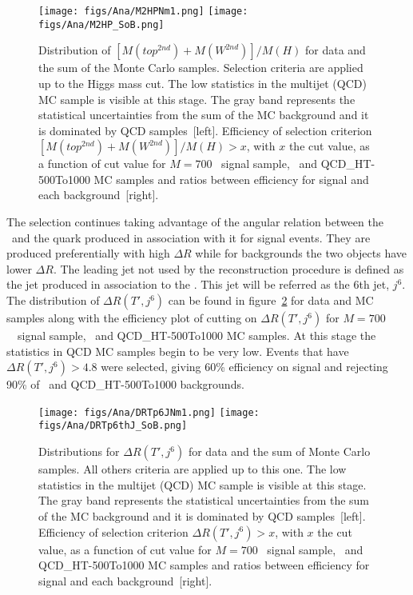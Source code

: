 \begin{figure}[!Hhtbp]
  \begin{center}
    \texttt{[image: figs/Ana/M2HPNm1.png]}
    \texttt{[image: figs/Ana/M2HP\_SoB.png]}
    \caption{Distribution of $\left[M(top^{2nd})+M(W^{2nd})\right]/M(H)$ for data and the sum of the Monte Carlo samples. Selection criteria are applied up to the Higgs mass cut. The low statistics in the multijet (QCD) MC sample is visible at this stage. The gray band represents the statistical uncertainties from the sum of the MC background and it is dominated by QCD samples~[left]. Efficiency of selection criterion $\left[M(top^{2nd})+M(W^{2nd})\right]/M(H)>x$, with $x$ the cut value, as a function of cut value for $M=700$ \GeVcc~signal sample, \ttbar~and QCD\_HT-500To1000 MC samples and ratios between efficiency for signal and each background~[right].}
    \label{fig:m2thp}
  \end{center}
\end{figure}

The selection continues taking advantage of the angular relation between the \Tp~and the quark produced in association with it for signal events. They are produced preferentially with high $\Delta R$ while for backgrounds the two objects have lower $\Delta R$. The leading jet not used by the reconstruction procedure is defined as the jet produced in association to the \Tp. This jet will be referred as the 6th jet, $j^{6}$. The distribution of $\Delta R (T', j^{6})$ can be found in figure~\ref{fig:jet6} for data and MC samples along with the efficiency plot of cutting on $\Delta R (T',j^{6})$ for ${M=700}$~\GeVcc~signal sample, \ttbar~and QCD\_HT-500To1000 MC samples. At this stage the statistics in QCD MC samples begin to be very low. Events that have $\Delta R (T',j^{6})>4.8$ were selected, giving 60\% efficiency on signal and rejecting 90\% of \ttbar~and QCD\_HT-500To1000 backgrounds.

\begin{figure}[!Hhtbp]
  \begin{center}
    \texttt{[image: figs/Ana/DRTp6JNm1.png]}
    \texttt{[image: figs/Ana/DRTp6thJ\_SoB.png]}
    \caption{Distributions for $\Delta R (T',j^{6})$  for data and the sum of Monte Carlo samples. All others criteria are applied up to this one. The low statistics in the multijet (QCD) MC sample is visible at this stage. The gray band represents the statistical uncertainties from the sum of the MC background and it is dominated by QCD samples~[left]. Efficiency of selection criterion $\Delta R (T',j^{6})>x$, with $x$ the cut value, as a function of cut value for $M=700$ \GeVcc~signal sample, \ttbar~and QCD\_HT-500To1000 MC samples and ratios between efficiency for signal and each background~[right].}
    \label{fig:jet6}
  \end{center}
\end{figure}

